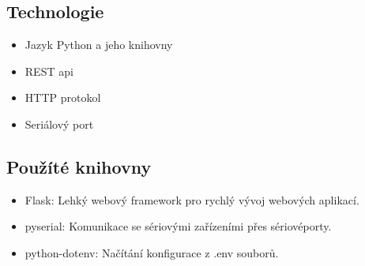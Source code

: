 \subsection*{Technologie}
\begin{itemize}
    \item Jazyk Python a jeho knihovny
    \item REST api
    \item HTTP protokol
    \item Seriálový port
\end{itemize}

\subsection*{Použíté knihovny}
\begin{itemize}
    \item Flask: Lehký webový framework pro rychlý vývoj webových aplikací.
    \item pyserial: Komunikace se sériovými zařízeními přes sériovéporty.
    \item python-dotenv: Načítání konfigurace z .env souborů.
\end{itemize}


%

%
